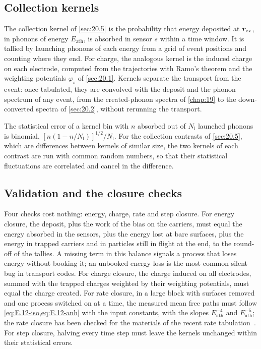 \subsection{Collection kernels}

The collection kernel of \cref{sec:20.5} is the probability that energy deposited at $\bm{r}_{\mathrm{ev}}$, in phonons of energy $E_{\mathrm{ath}}$, is absorbed in sensor $s$ within a time window. It is tallied by launching phonons of each energy from a grid of event positions and counting where they end. For charge, the analogous kernel is the induced charge on each electrode, computed from the trajectories with Ramo's theorem and the weighting potentials $\varphi_s$ of \cref{sec:20.1}. Kernels separate the transport from the event: once tabulated, they are convolved with the deposit and the phonon spectrum of any event, from the created-phonon spectra of \cref{chap:19} to the down-converted spectra of \cref{sec:20.2}, without rerunning the transport.

The statistical error of a kernel bin with $n$ absorbed out of $N_{\mathrm{l}}$ launched phonons is binomial, $[n(1 - n/N_{\mathrm{l}})]^{1/2}/N_{\mathrm{l}}$. For the collection contrasts of \cref{sec:20.5}, which are differences between kernels of similar size, the two kernels of each contrast are run with common random numbers, so that their statistical fluctuations are correlated and cancel in the difference.

\subsection{Validation and the closure checks}

Four checks cost nothing: energy, charge, rate and step closure. For energy closure, the deposit, plus the work of the bias on the carriers, must equal the energy absorbed in the sensors, plus the energy lost at bare surfaces, plus the energy in trapped carriers and in particles still in flight at the end, to the round-off of the tallies. A missing term in this balance signals a process that loses energy without booking it; an unbooked energy loss is the most common silent bug in transport codes. For charge closure, the charge induced on all electrodes, summed with the trapped charges weighted by their weighting potentials, must equal the charge created. For rate closure, in a large block with surfaces removed and one process switched on at a time, the measured mean free paths must follow \cref{eq:E.12-iso,eq:E.12-anh} with the input constants, with the slopes $E_{\mathrm{ath}}^{-4}$ and $E_{\mathrm{ath}}^{-5}$; the rate closure has been checked for the materials of the recent rate tabulation~\cite[Sect.~3]{hernandez2025modeling}. For step closure, halving every time step must leave the kernels unchanged within their statistical errors.

